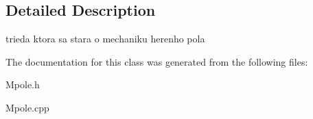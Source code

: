 

\subsection{Detailed Description}
trieda ktora sa stara o mechaniku herenho pola 

The documentation for this class was generated from the following files\-:\begin{DoxyCompactItemize}
\item 
Mpole.\-h\item 
Mpole.\-cpp\end{DoxyCompactItemize}
